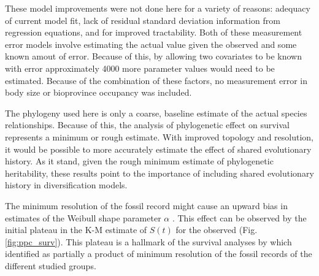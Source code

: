 \documentclass[12pt,letterpaper]{article}
\begin{document}
These model improvements were not done here for a variety of reasons: adequacy of current model fit, lack of residual standard deviation information from regression equations, and for improved tractability. Both of these measurement error models involve estimating the actual value given the observed and some known amout of error. Because of this, by allowing two covariates to be known with error approximately 4000 more parameter values would need to be estimated. Because of the combination of these factors, no measurement error in body size or bioprovince occupancy was included.

The phylogeny used here is only a coarse, baseline estimate of the actual species relationships. Because of this, the analysis of phylogenetic effect on survival represents a minimum or rough estimate. With improved topology and resolution, it would be possible to more accurately estimate the effect of shared evolutionary history. As it stand, given the rough minimum estimate of phylogenetic heritability, these results point to the importance of including shared evolutionary history in diversification models.

The minimum resolution of the fossil record might cause an upward bias in estimates of the Weibull shape parameter \(\alpha\) \citep{Sepkoski1975}. This effect can be observed by the initial plateau in the K-M estimate of \(S(t)\) for the observed (Fig. \ref{fig:ppc_surv}). This plateau is a hallmark of the survival analyses by \citet{VanValen1973} which \citet{Sepkoski1975} identified as partially a product of minimum resolution of the fossil records of the different studied groups.



\end{document}
